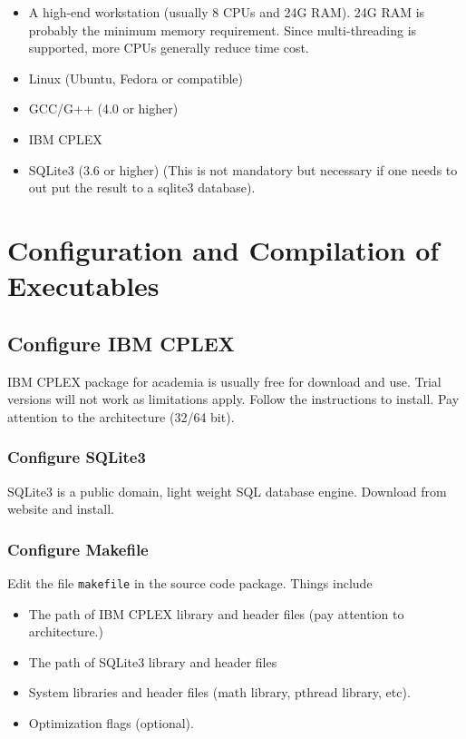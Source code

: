 \documentclass{article}
\begin{document}
\begin{itemize}

\item A high-end workstation (usually 8 CPUs and
24G RAM). 24G RAM is probably the minimum memory
requirement. Since multi-threading is supported,
more CPUs generally reduce time cost.

\item Linux (Ubuntu, Fedora or compatible)

\item GCC/G++ (4.0 or higher)

\item IBM CPLEX

\item SQLite3 (3.6 or higher) (This is not mandatory 
but necessary if one needs to out put the result to
a sqlite3 database).

\end{itemize}


\section{Configuration and Compilation of Executables}


\subsection{Configure IBM CPLEX}

IBM CPLEX package for academia is usually free for download
and use. Trial versions will not work as limitations apply.
Follow the instructions to install. Pay attention to the
architecture (32/64 bit).


\subsubsection{Configure SQLite3}

SQLite3 is a public domain, light weight SQL database engine.
Download from website and install.


\subsubsection{Configure Makefile}

Edit the file \texttt{makefile} in the source code package.
Things include

\begin{itemize}

\item The path of IBM CPLEX library and header files
(pay attention to architecture.)

\item The path of SQLite3 library and header files

\item System libraries and header files (math library,
pthread library, etc).

\item Optimization flags (optional).

\end{itemize}
\end{document}
